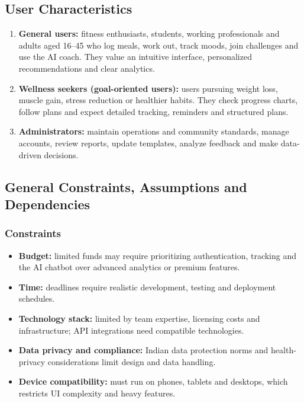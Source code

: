 \documentclass[11pt,a4paper]{report}
\begin{document}
\subsection{User Characteristics}
\begin{enumerate}
 \item \textbf{General users:} fitness enthusiasts, students, working professionals and adults aged 16--45 who log meals, work out, track moods, join challenges and use the AI coach. They value an intuitive interface, personalized recommendations and clear analytics.
 \item \textbf{Wellness seekers (goal-oriented users):} users pursuing weight loss, muscle gain, stress reduction or healthier habits. They check progress charts, follow plans and expect detailed tracking, reminders and structured plans.
 \item \textbf{Administrators:} maintain operations and community standards, manage accounts, review reports, update templates, analyze feedback and make data-driven decisions.
\end{enumerate}

\subsection{General Constraints, Assumptions and Dependencies}
\subsubsection*{Constraints}
\begin{itemize}
 \item \textbf{Budget:} limited funds may require prioritizing authentication, tracking and the AI chatbot over advanced analytics or premium features.
 \item \textbf{Time:} deadlines require realistic development, testing and deployment schedules.
 \item \textbf{Technology stack:} limited by team expertise, licensing costs and infrastructure; API integrations need compatible technologies.
 \item \textbf{Data privacy and compliance:} Indian data protection norms and health-privacy considerations limit design and data handling.
 \item \textbf{Device compatibility:} must run on phones, tablets and desktops, which restricts UI complexity and heavy features.
\end{itemize}
\end{document}
